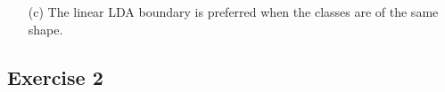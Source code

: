 \documentclass[12pt]{article}
\begin{document}
\begin{itemize}
\begin{itemize}
\item[(c)] 
The linear LDA boundary is preferred when the classes are of the same shape.
\vspace{1cm} %
\end{itemize}
\end{itemize}

\subsection*{Exercise 2}

\vspace{2in} %
\end{document}
